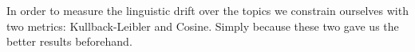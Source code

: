 In order to measure the linguistic drift over the topics we constrain ourselves with two metrics: Kullback-Leibler and Cosine. Simply because these two gave us the better results beforehand. 